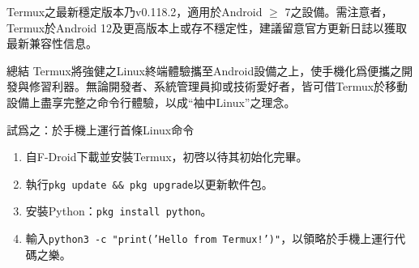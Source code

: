 Termux之最新穩定版本乃v0.118.2，適用於Android $\geq$ 7之設備。需注意者，Termux於Android 12及更高版本上或存不穩定性，建議留意官方更新日誌以獲取最新兼容性信息。

\begin{tcbinfo}{總結}
Termux將強健之Linux終端體驗攜至Android設備之上，使手機化爲便攜之開發與修習利器。無論開發者、系統管理員抑或技術愛好者，皆可借Termux於移動設備上盡享完整之命令行體驗，以成“袖中Linux”之理念。

\end{tcbinfo}

\begin{tcbpractice}{試爲之：於手機上運行首條Linux命令}
\begin{enumerate}
  \item 自F-Droid下載並安裝Termux，初啓以待其初始化完畢。
  \item 執行\texttt{pkg update \&\& pkg upgrade}以更新軟件包。
  \item 安裝Python：\texttt{pkg install python}。
  \item 輸入\texttt{python3 -\allowbreak c "print('Hello from Termux!')"}，以領略於手機上運行代碼之樂。
\end{enumerate}

\end{tcbpractice}
